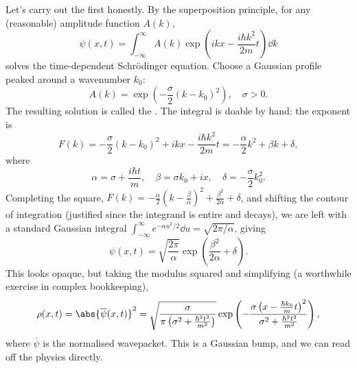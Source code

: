 Let's carry out the first honestly. By the superposition principle, for any (reasonable) amplitude function $A(k)$,
$$
\psi(x, t) = \int_{-\infty}^{\infty} A(k) \exp\left(ikx - \frac{i \hbar k^2}{2m}t\right) \dd k
$$
solves the time-dependent Schr\"odinger equation. Choose a Gaussian profile peaked around a wavenumber $k_0$:
$$
A(k) = \exp\left( -\frac{\sigma}{2}(k - k_0)^2 \right), \quad \sigma > 0.
$$
The resulting solution is called the . The integral is doable by hand: the exponent is
$$
F(k) = -\frac{\sigma}{2}(k - k_0)^2 + ikx - \frac{i \hbar k^2}{2m} t = -\frac{\alpha}{2} k^2 + \beta k + \delta,
$$
where
$$
\alpha = \sigma + \frac{i \hbar t}{m}, \quad \beta = \sigma k_0 + i x, \quad \delta = -\frac{\sigma}{2} k_0^2.
$$
Completing the square, $F(k) = -\frac{\alpha}{2}\left(k - \frac{\beta}{\alpha}\right)^2 + \frac{\beta^2}{2 \alpha} + \delta$, and shifting the contour of integration (justified since the integrand is entire and decays), we are left with a standard Gaussian integral $\int_{-\infty}^\infty e^{-\alpha u^2/2} \dd u = \sqrt{2\pi/\alpha}$, giving
$$
\psi(x, t) = \sqrt{\frac{2 \pi}{\alpha}} \exp\left( \frac{\beta^2}{2\alpha} + \delta \right).
$$
This looks opaque, but taking the modulus squared and simplifying (a worthwhile exercise in complex bookkeeping),
$$
\rho(x, t) = \abs{\overline{\psi}(x,t)}^2 = \sqrt{\frac{\sigma}{\pi\left(\sigma^2 + \frac{\hbar^2 t^2}{m^2}\right)}} \exp\left( -\frac{\sigma \left(x - \frac{\hbar k_0}{m} t\right)^2}{\sigma^2 + \frac{\hbar^2 t^2}{m^2}} \right),
$$
where $\overline{\psi}$ is the normalised wavepacket. This is a Gaussian bump, and we can read off the physics directly.

